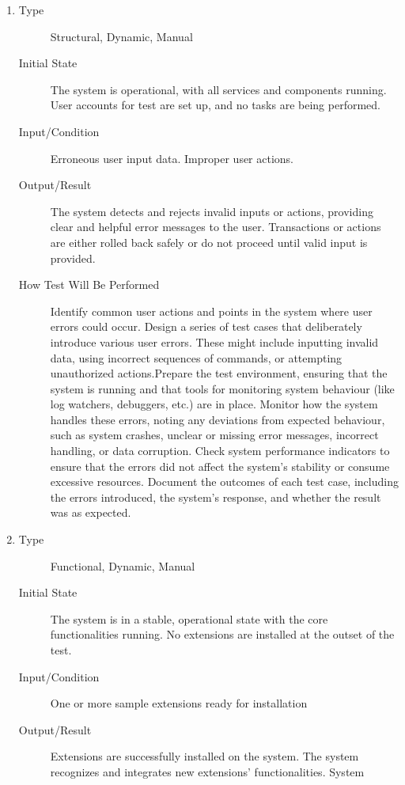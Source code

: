 \documentclass[12pt, titlepage]{article}
\begin{document}
\begin{enumerate}[NFR-T1]
\item \label{NFRT4}
  \begin{description}
  \item[Type] Structural, Dynamic, Manual
  \item[Initial State] The system is operational, with all services and components
    running. User accounts for test are set up, and no tasks are being
    performed.
  \item[Input/Condition] Erroneous user input data. Improper user actions.
  \item[Output/Result] The system detects and rejects invalid inputs or actions,
    providing clear and helpful error messages to the user. Transactions or
    actions are either rolled back safely or do not proceed until valid input is
    provided.
  \item[How Test Will Be Performed] Identify common user actions and points in the
    system where user errors could occur. Design a series of test cases that
    deliberately introduce various user errors. These might include inputting
    invalid data, using incorrect sequences of commands, or attempting
    unauthorized actions.Prepare the test environment, ensuring that the system
    is running and that tools for monitoring system behaviour (like log
    watchers, debuggers, etc.) are in place. Monitor how the system handles
    these errors, noting any deviations from expected behaviour, such as system
    crashes, unclear or missing error messages, incorrect handling, or data
    corruption. Check system performance indicators to ensure that the errors
    did not affect the system's stability or consume excessive resources.
    Document the outcomes of each test case, including the errors introduced,
    the system's response, and whether the result was as expected.
  \end{description}
\item \label{NFRT5}
  \begin{description}
  \item[Type] Functional, Dynamic, Manual
  \item[Initial State] The system is in a stable, operational state with the core
    functionalities running. No extensions are installed at the outset of the
    test.
  \item[Input/Condition] One or more sample extensions ready for installation
  \item[Output/Result] Extensions are successfully installed on the system. The
    system recognizes and integrates new extensions' functionalities. System

\end{description}
\end{enumerate}
\end{document}
